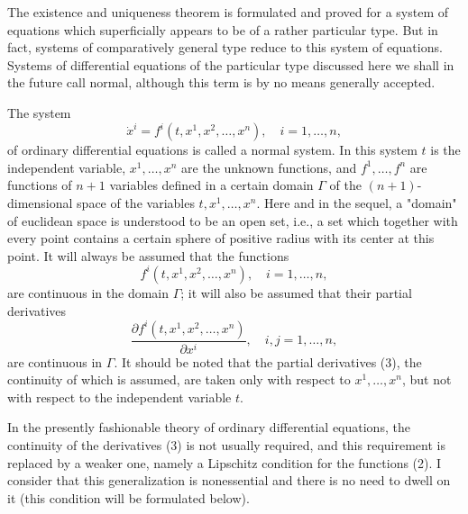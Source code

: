 \documentclass[10pt,a5paper]{book}
\theoremstyle{plain}
\theoremstyle{definition}
\theoremstyle{remark}
\begin{document}
The existence and uniqueness theorem is formulated and proved for a system of equations which superficially appears to be of a rather particular type. But in fact, systems of comparatively general type reduce to this system of equations. Systems of differential equations of the particular type discussed here we shall in the future call normal, although this term is by no means generally accepted.

The system
\begin{equation*}
\dot{x}^{i}=f^{i}\left(t, x^{1}, x^{2}, \ldots, x^{n}\right), \quad i=1, \ldots, n, \tag{1}
\end{equation*}
of ordinary differential equations is called a normal system. In this system $t$ is the independent variable, $x^{1}, \ldots, x^{n}$ are the unknown functions, and $f^{1}, \ldots, f^{n}$ are functions of $n+1$ variables defined in a certain domain $\Gamma$ of the $(n+1)$-dimensional space of the variables $t, x^{1}, \ldots, x^{n}$. Here and in the sequel, a "domain" of euclidean space is understood to be an open set, i.e., a set which together with every point contains a certain sphere of positive radius with its center at this point. It will always be assumed that the functions
\begin{equation*}
f^{i}\left(t, x^{1}, x^{2}, \ldots, x^{n}\right), \quad i=1, \ldots, n, \tag{2}
\end{equation*}
are continuous in the domain $\Gamma$; it will also be assumed that their partial derivatives
\begin{equation*}
\frac{\partial f^{i}\left(t, x^{1}, x^{2}, \ldots, x^{n}\right)}{\partial x^{i}}, \quad i, j=1, \ldots, n, \tag{3}
\end{equation*}
are continuous in $\Gamma$. It should be noted that the partial derivatives (3), the continuity of which is assumed, are taken only with respect to $x^{1}, \ldots, x^{n}$, but not with respect to the independent variable $t$.

In the presently fashionable theory of ordinary differential equations, the continuity of the derivatives (3) is not usually required, and this requirement is replaced by a weaker one, namely a Lipschitz condition for the functions (2). I consider that this generalization is nonessential and there is no need to dwell on it (this condition will be formulated below).
\end{document}
